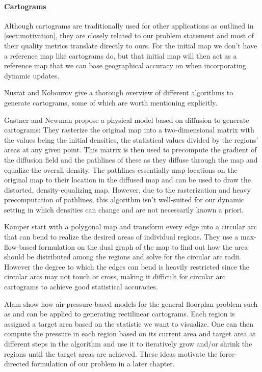 \paragraph{Cartograms}

Although cartograms are traditionally used for other applications as outlined in \cref{sect:motivation}, they are closely related to our problem statement and most of their quality metrics translate directly to ours. For the initial map we don't have a reference map like cartograms do, but that initial map will then act as a reference map that we can base geographical accuracy on when incorporating dynamic updates.

Nusrat and Kobourov \cite{nusrat2016state} give a thorough overview of different algorithms to generate cartograms, some of which are worth mentioning explicitly.

Gastner and Newman \cite{gastner2004diffusion} propose a physical model based on diffusion to generate cartograms: They rasterize the original map into a two-dimensional matrix with the values being the initial densities, \ie{} the statistical values divided by the regions' areas at any given point. This matrix is then used to precompute the gradient of the diffusion field and the pathlines of these  as they diffuse through the map and equalize the overall density. The pathlines essentially map locations on the original map to their location in the diffused map and can be used to draw the distorted, density-equalizing map. However, due to the rasterization and heavy precomputation of pathlines, this algorithm isn't well-suited for our dynamic setting in which densities can change and are not necessarily known a priori.

Kämper \etal{} \cite{kamper2013circular} start with a polygonal map and transform every edge into a circular arc that can bend to realize the desired areas of individual regions. They use a max-flow-based formulation on the dual graph of the map to find out how the area should be distributed among the regions and solve for the circular arc radii. However the degree to which the edges can bend is heavily restricted since the circular arcs may not touch or cross, making it difficult for circular arc cartograms to achieve good statistical accuracies.

Alam \etal{} \cite{alam2013computing} show how air-pressure-based models for the general floorplan problem such as \cite{izumi1998air} and \cite{felsner2013exploiting} can be applied to generating rectilinear cartograms. Each region is assigned a target area based on the statistic we want to visualize. One can then compute the pressure in each region based on its current area and target area at different steps in the algorithm and use it to iteratively grow and/or shrink the regions until the target areas are achieved. These ideas motivate the force-directed formulation of our problem in a later chapter.


